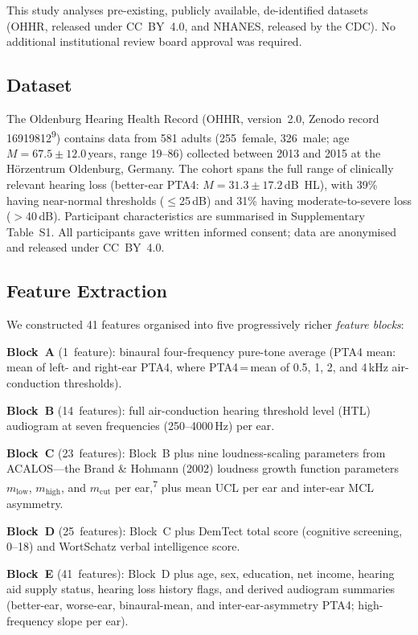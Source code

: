 \documentclass[12pt,a4paper]{article}
\begin{document}
This study analyses pre-existing, publicly available, de-identified datasets
(OHHR, released under CC~BY~4.0, and NHANES, released by the CDC).  No
additional institutional review board approval was required.

\subsection{Dataset}

The Oldenburg Hearing Health Record (OHHR, version~2.0, Zenodo record
16919812\textsuperscript{9}) contains data from 581 adults (255~female,
326~male; age $M{=}67.5{\pm}12.0$\,years, range 19--86) collected between
2013 and 2015 at the Hörzentrum Oldenburg, Germany.  The cohort spans the
full range of clinically relevant hearing loss (better-ear PTA4:
$M{=}31.3{\pm}17.2$\,dB~HL), with 39\% having near-normal thresholds
($\leq$25\,dB) and 31\% having moderate-to-severe loss ($>$40\,dB).
Participant characteristics are summarised in Supplementary Table~S1.
All participants gave written informed consent; data are anonymised and
released under CC~BY~4.0.

\subsection{Feature Extraction}

We constructed 41 features organised into five progressively richer
\textit{feature blocks}:

\textbf{Block~A} (1~feature): binaural four-frequency pure-tone average
(PTA4 mean: mean of left- and right-ear PTA4, where PTA4\,=\,mean of 0.5,
1, 2, and 4\,kHz air-conduction thresholds).

\textbf{Block~B} (14~features): full air-conduction hearing threshold level
(HTL) audiogram at seven frequencies (250--4000\,Hz) per ear.

\textbf{Block~C} (23~features): Block~B plus nine loudness-scaling parameters
from ACALOS---the Brand \& Hohmann (2002) loudness growth function parameters
$m_\text{low}$, $m_\text{high}$, and $m_\text{cut}$ per ear,\textsuperscript{7}
plus mean UCL per ear and inter-ear MCL asymmetry.

\textbf{Block~D} (25~features): Block~C plus DemTect total score (cognitive
screening, 0--18) and WortSchatz verbal intelligence score.

\textbf{Block~E} (41~features): Block~D plus age, sex, education, net income,
hearing aid supply status, hearing loss history flags, and derived audiogram
summaries (better-ear, worse-ear, binaural-mean, and inter-ear-asymmetry
PTA4; high-frequency slope per ear).
\end{document}
